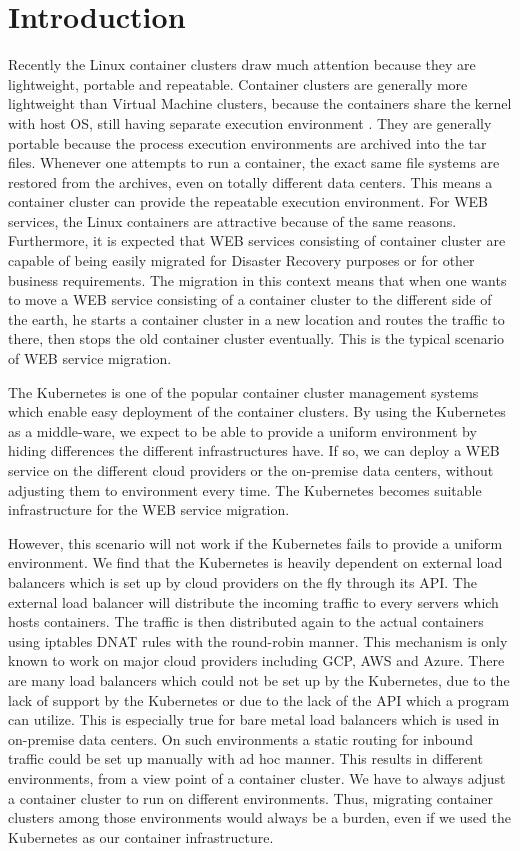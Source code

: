 \section{Introduction}

Recently the Linux container clusters draw much attention because they are lightweight, portable and repeatable.
Container clusters are generally more lightweight than Virtual Machine clusters, 
because the containers share the kernel with host OS, still having separate execution environment . 
They are generally portable because the process execution environments are archived into the tar files.
Whenever one attempts to run a container, the exact same file systems are restored from the archives, 
even on totally different data centers. 
This means a container cluster can provide the repeatable execution environment.
For WEB services, the Linux containers are attractive because of the same reasons. 
Furthermore, it is expected that WEB services consisting of container cluster are 
capable of being easily migrated for Disaster Recovery purposes or for other business requirements.
The migration in this context means that when one wants to move a WEB service consisting of a container cluster 
to the different side of the earth, he starts a container cluster in a new location and 
routes the traffic to there, then stops the old container cluster eventually.
This is the typical scenario of WEB service migration.

The Kubernetes\cite{K8s2017} is one of the popular container cluster management systems
which enable easy deployment of the container clusters.
By using the Kubernetes as a middle-ware, we expect to be able to provide a uniform environment by hiding differences the different infrastructures have.
If so, we can deploy a WEB service on the different cloud providers or the on-premise data centers, without adjusting them to environment every time.
The Kubernetes becomes suitable infrastructure for the WEB service migration.

However, this scenario will not work if the Kubernetes fails to provide a uniform environment. 
We find that the Kubernetes is heavily dependent on external load balancers 
which is set up by cloud providers on the fly through its API. 
The external load balancer will distribute the incoming traffic to every servers which hosts containers.
The traffic is then distributed again to the actual containers using iptables DNAT\cite{MartinA.Brown2017,Marmol2015} 
rules with the round-robin manner. 
This mechanism is only known to work on major cloud providers including GCP, AWS and Azure.
There are many load balancers which could not be set up by the Kubernetes, 
due to the lack of support by the Kubernetes or due to the lack of the API which a program can utilize.
This is especially true for bare metal load balancers which is used in on-premise data centers.
On such environments a static routing for inbound traffic could be set up manually with ad hoc manner.
This results in different environments, from a view point of a container cluster.
We have to always adjust a container cluster to run on different environments.
Thus, migrating container clusters among those environments would always be a burden, even if we used the Kubernetes as our container infrastructure.

